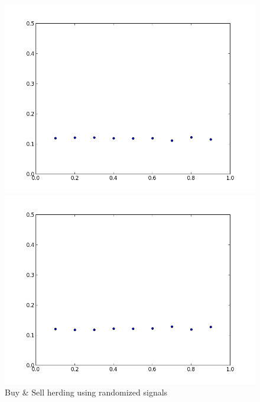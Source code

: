 \documentclass{article}
\begin{document}
\begin{figure}
  \begin{minipage}{0.5\textwidth}
    \begin{flushleft}
      \includegraphics[width=\textwidth]{buyherd.png}
    \end{flushleft}
  \end{minipage}
  \begin{minipage}{0.5\textwidth}
    \begin{flushright}
      \includegraphics[width=\textwidth]{sellherd.png}
    \end{flushright}
  \end{minipage}
  \caption{Buy \& Sell herding using randomized signals}
\end{figure}
\end{document}
